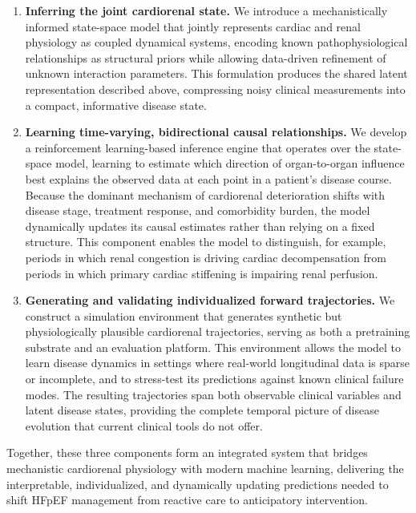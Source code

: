 \documentclass[pmlr]{jmlr}
\begin{document}
\begin{enumerate}
\item \textbf{Inferring the joint cardiorenal state.} We introduce a mechanistically informed state-space model that jointly represents cardiac and renal physiology as coupled dynamical systems, encoding known pathophysiological relationships as structural priors while allowing data-driven refinement of unknown interaction parameters. This formulation produces the shared latent representation described above, compressing noisy clinical measurements into a compact, informative disease state.

\item \textbf{Learning time-varying, bidirectional causal relationships.} We develop a reinforcement learning-based inference engine that operates over the state-space model, learning to estimate which direction of organ-to-organ influence best explains the observed data at each point in a patient's disease course. Because the dominant mechanism of cardiorenal deterioration shifts with disease stage, treatment response, and comorbidity burden, the model dynamically updates its causal estimates rather than relying on a fixed structure. This component enables the model to distinguish, for example, periods in which renal congestion is driving cardiac decompensation from periods in which primary cardiac stiffening is impairing renal perfusion.

\item \textbf{Generating and validating individualized forward trajectories.} We construct a simulation environment that generates synthetic but physiologically plausible cardiorenal trajectories, serving as both a pretraining substrate and an evaluation platform. This environment allows the model to learn disease dynamics in settings where real-world longitudinal data is sparse or incomplete, and to stress-test its predictions against known clinical failure modes. The resulting trajectories span both observable clinical variables and latent disease states, providing the complete temporal picture of disease evolution that current clinical tools do not offer.
\end{enumerate}

Together, these three components form an integrated system that bridges mechanistic cardiorenal physiology with modern machine learning, delivering the interpretable, individualized, and dynamically updating predictions needed to shift HFpEF management from reactive care to anticipatory intervention.
\end{document}
